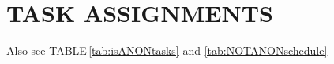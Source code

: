 \documentclass[usenames,dvipsnames,modern]{CLASS_FILES/aastex631}
\begin{document}

\newpage
\mbox{} \vfill
\section{TASK ASSIGNMENTS}
\vfill \mbox{}
Also see TABLE\,\ref{tab:isANONtasks} and \ref{tab:NOTANONschedule}

\newpage
\end{document}
